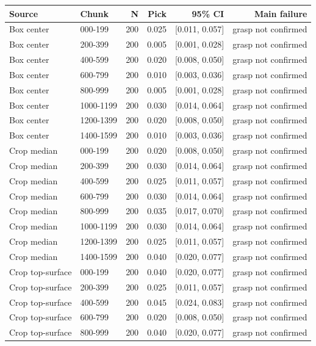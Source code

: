 \begin{tabular}{llrrrr}
\toprule
Source & Chunk & N & Pick & 95\% CI & Main failure \\
\midrule
Box center & 000-199 & 200 & 0.025 & [0.011, 0.057] & grasp not confirmed \\
Box center & 200-399 & 200 & 0.005 & [0.001, 0.028] & grasp not confirmed \\
Box center & 400-599 & 200 & 0.020 & [0.008, 0.050] & grasp not confirmed \\
Box center & 600-799 & 200 & 0.010 & [0.003, 0.036] & grasp not confirmed \\
Box center & 800-999 & 200 & 0.005 & [0.001, 0.028] & grasp not confirmed \\
Box center & 1000-1199 & 200 & 0.030 & [0.014, 0.064] & grasp not confirmed \\
Box center & 1200-1399 & 200 & 0.020 & [0.008, 0.050] & grasp not confirmed \\
Box center & 1400-1599 & 200 & 0.010 & [0.003, 0.036] & grasp not confirmed \\
Crop median & 000-199 & 200 & 0.020 & [0.008, 0.050] & grasp not confirmed \\
Crop median & 200-399 & 200 & 0.030 & [0.014, 0.064] & grasp not confirmed \\
Crop median & 400-599 & 200 & 0.025 & [0.011, 0.057] & grasp not confirmed \\
Crop median & 600-799 & 200 & 0.030 & [0.014, 0.064] & grasp not confirmed \\
Crop median & 800-999 & 200 & 0.035 & [0.017, 0.070] & grasp not confirmed \\
Crop median & 1000-1199 & 200 & 0.030 & [0.014, 0.064] & grasp not confirmed \\
Crop median & 1200-1399 & 200 & 0.025 & [0.011, 0.057] & grasp not confirmed \\
Crop median & 1400-1599 & 200 & 0.040 & [0.020, 0.077] & grasp not confirmed \\
Crop top-surface & 000-199 & 200 & 0.040 & [0.020, 0.077] & grasp not confirmed \\
Crop top-surface & 200-399 & 200 & 0.025 & [0.011, 0.057] & grasp not confirmed \\
Crop top-surface & 400-599 & 200 & 0.045 & [0.024, 0.083] & grasp not confirmed \\
Crop top-surface & 600-799 & 200 & 0.020 & [0.008, 0.050] & grasp not confirmed \\
Crop top-surface & 800-999 & 200 & 0.040 & [0.020, 0.077] & grasp not confirmed \\

\end{tabular}
